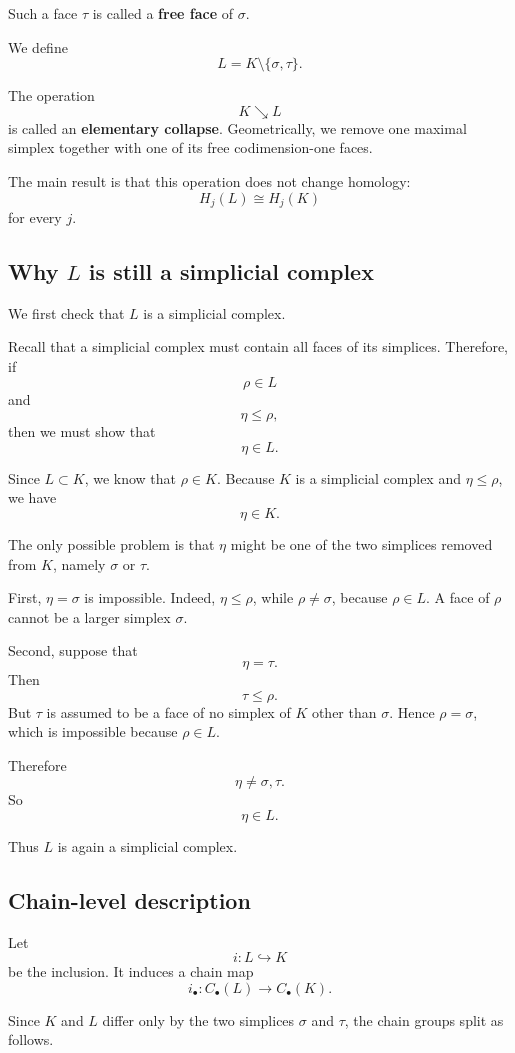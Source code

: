 \documentclass[12pt,a4paper]{article}
\theoremstyle{notespace}
\begin{document}
Such a face \(\tau\) is called a \textbf{free face} of \(\sigma\).

We define
\[
L=K\setminus\{\sigma,\tau\}.
\]

The operation
\[
K\searrow L
\]
is called an \textbf{elementary collapse}. Geometrically, we remove one maximal simplex together with one of its free codimension-one faces.

The main result is that this operation does not change homology:
\[
H_j(L)\cong H_j(K)
\]
for every \(j\).

\subsection{Why \(L\) is still a simplicial complex}

We first check that \(L\) is a simplicial complex.

Recall that a simplicial complex must contain all faces of its simplices. Therefore, if
\[
\rho\in L
\]
and
\[
\eta\leq \rho,
\]
then we must show that
\[
\eta\in L.
\]

Since \(L\subset K\), we know that \(\rho\in K\). Because \(K\) is a simplicial complex and \(\eta\leq \rho\), we have
\[
\eta\in K.
\]

The only possible problem is that \(\eta\) might be one of the two simplices removed from \(K\), namely \(\sigma\) or \(\tau\).

First, \(\eta=\sigma\) is impossible. Indeed, \(\eta\leq \rho\), while \(\rho\neq \sigma\), because \(\rho\in L\). A face of \(\rho\) cannot be a larger simplex \(\sigma\).

Second, suppose that
\[
\eta=\tau.
\]
Then
\[
\tau\leq \rho.
\]
But \(\tau\) is assumed to be a face of no simplex of \(K\) other than \(\sigma\). Hence \(\rho=\sigma\), which is impossible because \(\rho\in L\).

Therefore
\[
\eta\neq \sigma,\tau.
\]
So
\[
\eta\in L.
\]

Thus \(L\) is again a simplicial complex.

\subsection{Chain-level description}

Let
\[
i\colon L\hookrightarrow K
\]
be the inclusion. It induces a chain map
\[
i_\bullet\colon C_\bullet(L)\to C_\bullet(K).
\]

Since \(K\) and \(L\) differ only by the two simplices \(\sigma\) and \(\tau\), the chain groups split as follows.
\end{document}

